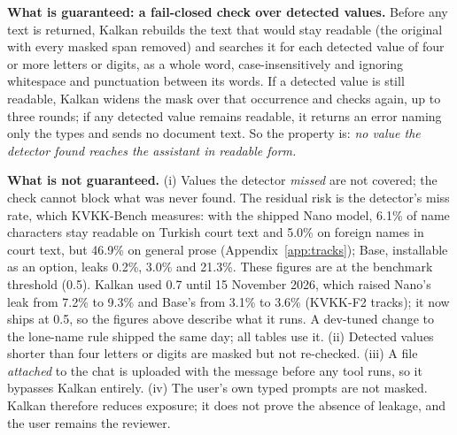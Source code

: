 \documentclass[10pt,twocolumn]{article}
\begin{document}
\textbf{What is guaranteed: a fail-closed check over detected values.} Before any text is returned, Kalkan
rebuilds the text that would stay readable (the original with every masked span removed) and searches it for
each detected value of four or more letters or digits, as a whole word, case-insensitively and ignoring
whitespace and punctuation between its words. If a detected value is still readable, Kalkan widens the mask over
that occurrence and checks again, up to three rounds; if any detected value remains readable, it returns an
error naming only the types and sends no document text. So the property is: \emph{no value the detector found
reaches the assistant in readable form.}

\textbf{What is not guaranteed.} (i) Values the detector \emph{missed} are not covered; the check cannot block
what was never found. The residual risk is the detector's miss rate, which KVKK-Bench measures: with the shipped
Nano model, 6.1\% of name characters stay readable on Turkish court text and 5.0\% on foreign names in court text,
but 46.9\% on general prose (Appendix~\ref{app:tracks}); Base, installable as an option, leaks 0.2\%, 3.0\% and
21.3\%. These figures are at the benchmark threshold (0.5). Kalkan used 0.7 until 15 November 2026, which
raised Nano's leak from 7.2\% to 9.3\% and Base's from 3.1\% to 3.6\% (KVKK-F2 tracks); it now ships at 0.5, so
the figures above describe what it runs. A dev-tuned change to the lone-name rule shipped the same day; all tables use it. (ii) Detected values shorter than four
letters or digits are masked but not re-checked. (iii) A file \emph{attached} to the chat is uploaded with the
message before any tool runs, so it bypasses Kalkan entirely. (iv) The user's own typed prompts are not masked.
Kalkan therefore reduces exposure; it does not prove the absence of leakage, and the user remains the reviewer.
\end{document}
